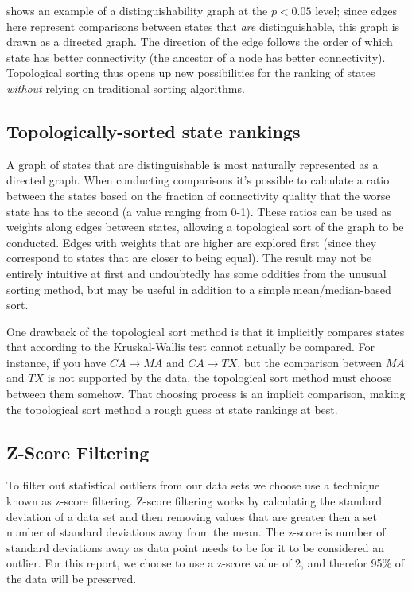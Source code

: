  shows an example of a distinguishability graph at the $p<0.05$ level; since edges here represent comparisons between states that \textit{are} distinguishable, this graph is drawn as a directed graph. The direction of the edge follows the order of which state has better connectivity (the ancestor of a node has better connectivity). Topological sorting thus opens up new possibilities for the ranking of states \textit{without} relying on traditional sorting algorithms.

\subsection{Topologically-sorted state rankings}\label{sec:methods_stats_topological_rankings}

A graph of states that are distinguishable is most naturally represented as a directed graph. When conducting comparisons it's possible to calculate a ratio between the states based on the fraction of connectivity quality that the worse state has to the second (a value ranging from 0-1). These ratios can be used as weights along edges between states, allowing a topological sort of the graph to be conducted. Edges with weights that are higher are explored first (since they correspond to states that are closer to being equal). The result may not be entirely intuitive at first and undoubtedly has some oddities from the unusual sorting method, but may be useful in addition to a simple mean/median-based sort.

One drawback of the topological sort method is that it implicitly compares states that according to the Kruskal-Wallis test cannot actually be compared. For instance, if you have $CA\rightarrow MA$ and $CA\rightarrow TX$, but the comparison between $MA$ and $TX$ is not supported by the data, the topological sort method must choose between them somehow. That choosing process is an implicit comparison, making the topological sort method a rough guess at state rankings at best.

\subsection{Z-Score Filtering} \label{sec:z-score-filtering}

To filter out statistical outliers from our data sets we choose use a technique known as z-score filtering. Z-score filtering works by calculating the standard deviation of a data set and then removing values that are greater then a set number of standard deviations away from the mean. The z-score is number of standard deviations away as data point needs to be for it to be considered an outlier. For this report, we choose to use a z-score value of 2, and therefor 95\% of the data will be preserved.
